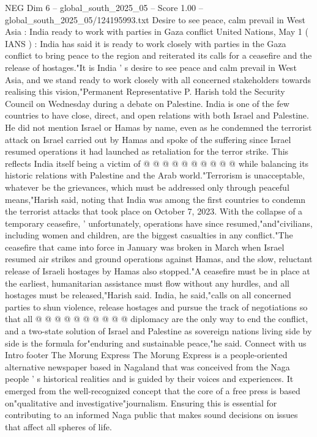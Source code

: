 \begin{textsample}{NEG Dim 6 – global\_south\_2025\_05 – Score 1.00 – global\_south\_2025\_05/124195993.txt}  \label{ex:f6_neg_418}
Desire to see peace, calm prevail in West Asia : India ready to work with parties in Gaza conflict United Nations, May 1 ( IANS ) : India has said it is ready to work closely with parties in the Gaza conflict to bring peace to the region and reiterated its calls for a ceasefire and the release of hostages."It is India ' s desire to see peace and calm prevail in West Asia, and we stand ready to work closely with all concerned stakeholders towards realising this vision,"Permanent Representative P.
Harish told the Security Council on Wednesday during a debate on Palestine.
India is one of the few countries to have close, direct, and open relations with both Israel and Palestine.
He did not mention Israel or Hamas by name, even as he condemned the terrorist attack on Israel carried out by Hamas and spoke of the suffering since Israel resumed operations it had launched as retaliation for the terror strike.
This reflects India itself being a victim of @ @ @ @ @ @ @ @ @ @ while balancing its historic relations with Palestine and the Arab world."Terrorism is unacceptable, whatever be the grievances, which must be addressed only through peaceful means,"Harish said, noting that India was among the first countries to condemn the terrorist attacks that took place on October 7, 2023.
With the collapse of a temporary ceasefire, ' unfortunately, operations have since resumed,"and"civilians, including women and children, are the biggest casualties in any conflict."The ceasefire that came into force in January was broken in March when Israel resumed air strikes and ground operations against Hamas, and the slow, reluctant release of Israeli hostages by Hamas also stopped."A ceasefire must be in place at the earliest, humanitarian assistance must flow without any hurdles, and all hostages must be released,"Harish said.
India, he said,"calls on all concerned parties to shun violence, release hostages and pursue the track of negotiations so that all @ @ @ @ @ @ @ @ @ @ diplomacy are the only way to end the conflict, and a two-state solution of Israel and Palestine as sovereign nations living side by side is the formula for"enduring and sustainable peace,"he said.
Connect with us Intro footer The Morung Express The Morung Express is a people-oriented alternative newspaper based in Nagaland that was conceived from the Naga people ' s historical realities and is guided by their voices and experiences.
It emerged from the well-recognized concept that the core of a free press is based on"qualitative and investigative"journalism.
Ensuring this is essential for contributing to an informed Naga public that makes sound decisions on issues that affect all spheres of life.

\end{textsample}
